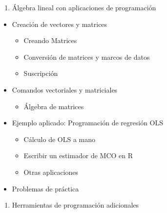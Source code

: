 \documentclass[
]{book}
\providecommand{\tightlist}{%
  \setlength{\itemsep}{0pt}\setlength{\parskip}{0pt}}
\begin{document}
\begin{enumerate}
\def\labelenumi{\arabic{enumi}.}
\setcounter{enumi}{9}
\tightlist
\item
  Álgebra lineal con aplicaciones de programación
\end{enumerate}

\begin{itemize}
\tightlist
\item
  Creación de vectores y matrices

  \begin{itemize}
  \tightlist
  \item
    Creando Matrices
  \item
    Conversión de matrices y marcos de datos
  \item
    Suscripción
  \end{itemize}
\item
  Comandos vectoriales y matriciales

  \begin{itemize}
  \tightlist
  \item
    Álgebra de matrices
  \end{itemize}
\item
  Ejemplo aplicado: Programación de regresión OLS

  \begin{itemize}
  \tightlist
  \item
    Cálculo de OLS a mano
  \item
    Escribir un estimador de MCO en R
  \item
    Otras aplicaciones
  \end{itemize}
\item
  Problemas de práctica
\end{itemize}

\begin{enumerate}
\def\labelenumi{\arabic{enumi}.}
\setcounter{enumi}{10}
\tightlist
\item
  Herramientas de programación adicionales
\end{enumerate}
\end{document}
